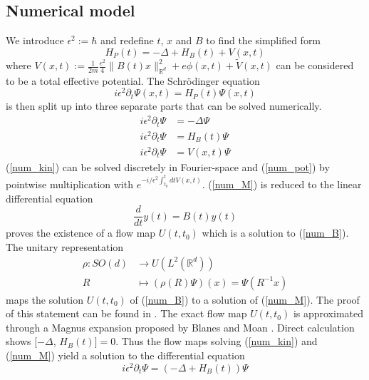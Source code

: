 \documentclass{article}
\begin{document}
\subsection{Numerical model}
We introduce $\epsilon ^2 := \hbar$ and redefine $t$, $x$ and $B$ to find the simplified form
\begin{equation}
  H_P(t) = -\Delta + H_B(t) + V(x,t)
\end{equation}
where $V(x,t) := \frac{1}{2m}\frac{e^{2}}{4}\|B(t) x\|_{\mathbb{R}^{d}}^{2} + e \phi(x,t) + \tilde{V}(x,t)$ can be considered to be a total effective potential.
The Schr{\"o}dinger equation
\begin{equation} \label{num_main} \tag{H}
  i \epsilon ^2 \partial_t \Psi(x, t) = H_P(t)\Psi(x,t)
\end{equation}
is then split up into three separate parts that can be solved numerically.
\begin{align}
  i \epsilon^2 \partial_t \Psi &= -\Delta \Psi \label{num_kin} \tag{K}\\
  i \epsilon^2 \partial_t \Psi &= H_B(t) \Psi \label{num_M} \tag{M}\\
  i \epsilon^2 \partial_t \Psi &= V(x,t) \Psi \label{num_pot} \tag{P}
\end{align}
(\ref{num_kin}) can be solved discretely in Fourier-space and (\ref{num_pot}) by pointwise multiplication with $e^{-i/\epsilon ^2 \int_{t_0}^t dt V(x,t)}$. (\ref{num_M}) is reduced to the linear differential equation
\begin{equation} \label{num_B} \tag{B}
  \frac{d}{dt}y(t) = B(t)y(t)
\end{equation}
\cite{simon_reed} proves the existence of a flow map $U(t,t_0)$ which is a solution to (\ref{num_B}). The unitary representation
\begin{align} \label{eq_rho}
  \rho : SO(d) &\longrightarrow U(L^2(\mathbb{R}^d)) \\
  R &\longmapsto (\rho (R)\Psi)(x) = \Psi(R^{-1} x)
\end{align}
maps the solution $U(t, t_0)$ of (\ref{num_B}) to a solution of (\ref{num_M}). The proof of this statement can be found in \cite{paper_orvg}. The exact flow map $U(t, t_0)$ is approximated through a Magnus expansion proposed by Blanes and Moan \cite{magnus_integrators}.
Direct calculation shows  $[-\Delta$, $H_B(t)] = 0$. Thus the flow maps solving (\ref{num_kin}) and (\ref{num_M}) yield a solution to the differential equation
\begin{equation} \label{num_K_M} \tag{K+M}
  i \epsilon ^2 \partial_t \Psi = (-\Delta + H_B(t))\Psi
\end{equation}
\end{document}
